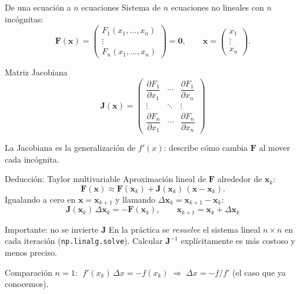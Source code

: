 \documentclass[aspectratio=169,11pt]{beamer}
\newcommand{\vect}[1]{\mathbf{#1}}
\newcommand{\Jac}{\mathbf{J}}
\begin{document}
\begin{frame}{De una ecuación a $n$ ecuaciones}
  Sistema de $n$ ecuaciones no lineales con $n$ incógnitas:
  \[
    \vect F(\vect x)=\begin{pmatrix}F_1(x_1,\dots,x_n)\\ \vdots\\ F_n(x_1,\dots,x_n)\end{pmatrix}=\vect 0,
    \qquad \vect x=\begin{pmatrix}x_1\\ \vdots\\ x_n\end{pmatrix}.
  \]
  \begin{block}{Matriz Jacobiana}
    \[
      \Jac(\vect x)=\begin{pmatrix}
        \dfrac{\partial F_1}{\partial x_1} & \cdots & \dfrac{\partial F_1}{\partial x_n}\\
        \vdots & \ddots & \vdots\\
        \dfrac{\partial F_n}{\partial x_1} & \cdots & \dfrac{\partial F_n}{\partial x_n}
      \end{pmatrix}
    \]
  \end{block}
  La Jacobiana es la \alert{generalización de $f'(x)$}: describe cómo cambia $\vect F$ al mover cada incógnita.
\end{frame}

\begin{frame}{Deducción: Taylor multivariable}
  Aproximación lineal de $\vect F$ alrededor de $\vect x_k$:
  \[
    \vect F(\vect x)\approx \vect F(\vect x_k)+\Jac(\vect x_k)\,(\vect x-\vect x_k).
  \]
  Igualando a cero en $\vect x=\vect x_{k+1}$ y llamando $\Delta\vect x_k=\vect x_{k+1}-\vect x_k$:
  \[
    \boxed{\;\Jac(\vect x_k)\,\Delta\vect x_k=-\vect F(\vect x_k),\qquad \vect x_{k+1}=\vect x_k+\Delta\vect x_k\;}
  \]
  \begin{alertblock}{Importante: no se invierte $\Jac$}
    En la práctica se \emph{resuelve} el sistema lineal $n\times n$ en cada iteración (\texttt{np.linalg.solve}). Calcular $\Jac^{-1}$ explícitamente es más costoso y menos preciso.
  \end{alertblock}
  \begin{block}{Comparación}
    \small $n=1$: $\;f'(x_k)\,\Delta x=-f(x_k)\;\Rightarrow\; \Delta x=-f/f'$ \quad (el caso que ya conocemos).
  \end{block}
\end{frame}
\end{document}

